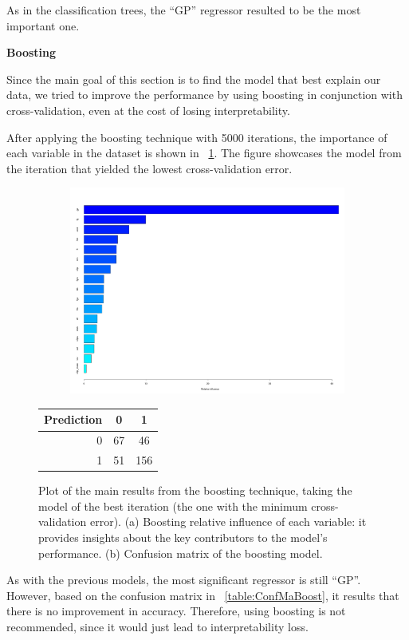 As in the classification trees, the ``GP'' regressor resulted to be the most important one.

\vspace{0.2cm}
\noindent
\textbf{Boosting}

Since the main goal of this section is to find the model that best explain our data, we tried to improve the performance by using boosting in conjunction with cross-validation, even at the cost of losing interpretability. 

After applying the boosting technique with 5000 iterations, the importance of each variable in the dataset is shown in \Fig~\ref{fig:boost_4_rel_inf}. The figure showcases the model from the iteration that yielded the lowest cross-validation error.

\begin{figure}[h]
	\centering
	\begin{subfigure}{0.5\textwidth}
		\centering
		\includegraphics[width=0.8\linewidth]{ImageFiles/Classification/Trees/boost_4_rel_inf_best.pdf}
		\caption{}
		\label{fig:boost_4_rel_inf}
	\end{subfigure}%
	\hfill
	\begin{subtable}{0.5\textwidth}
		\centering
		\begin{tabular}{|| cr | cc ||}    
			\hline
			\multicolumn{2}{|c|}{Prediction} 
			& 0 & 1 \\
			\hline
			\hline
			& 0 & 67 & 46 \\
			& 1 & 51 & 156 \\
			\hline
		\end{tabular}
		\caption{}
		\label{table:ConfMaBoost}
	\end{subtable}
	\caption{Plot of the main results from the boosting technique, taking the model of the best iteration (the one with the minimum cross-validation error). (a) Boosting relative influence of each variable: it provides insights about the key contributors to the model's performance. (b) Confusion matrix of the boosting model.}
	\label{BoostRes}
\end{figure}

As with the previous models, the most significant regressor is still ``GP''. However, based on the confusion matrix in \Tab~\ref{table:ConfMaBoost}, it results that there is no improvement in accuracy. Therefore, using boosting is not recommended, since it would just lead to interpretability loss.

